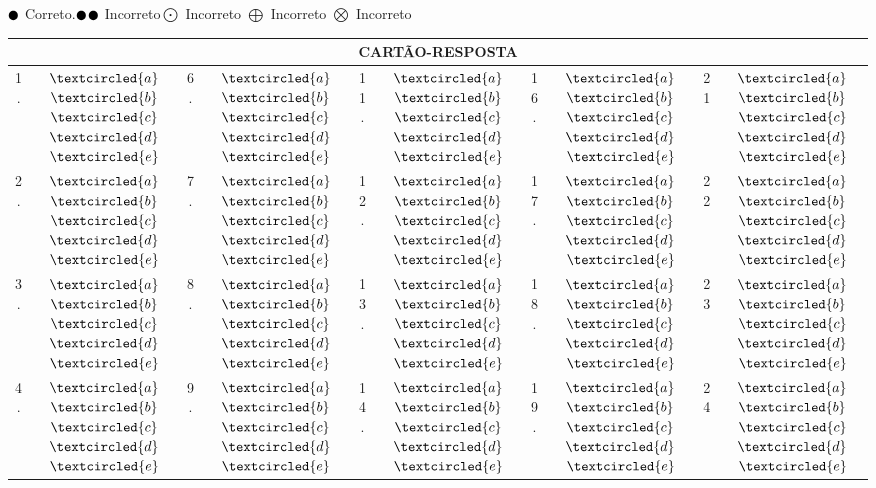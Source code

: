 \documentclass[14pt]{report}
\begin{document}
$\newmoon$ Correto.\hspace{2cm}$\newmoon$$\newmoon$ Incorreto\hspace{2cm}$\bigodot$ Incorreto\hspace{2cm} $\bigoplus$ Incorreto\hspace{2cm} $\bigotimes$ Incorreto
\Large
\begin{center}
 \begin{tabular}{ |c|c|c|c|c|c|c|c|c|c|}
 \hline
 \multicolumn{10}{|c|}{\vspace*{1cm}\LARGE{\textbf{CARTÃO-RESPOSTA}}}\\
 \hline
 \hline
 1. & $\textcircled{a}$$\textcircled{b}$$\textcircled{c}$$\textcircled{d}$$\textcircled{e}$&6.&$\textcircled{a}$$\textcircled{b}$$\textcircled{c}$$\textcircled{d}$$\textcircled{e}$&11.&$\textcircled{a}$$\textcircled{b}$$\textcircled{c}$$\textcircled{d}$$\textcircled{e}$&16.&$\textcircled{a}$$\textcircled{b}$$\textcircled{c}$$\textcircled{d}$$\textcircled{e}$&21&$\textcircled{a}$$\textcircled{b}$$\textcircled{c}$$\textcircled{d}$$\textcircled{e}$ \\
 2. & $\textcircled{a}$$\textcircled{b}$$\textcircled{c}$$\textcircled{d}$$\textcircled{e}$&7.&$\textcircled{a}$$\textcircled{b}$$\textcircled{c}$$\textcircled{d}$$\textcircled{e}$&12.&$\textcircled{a}$$\textcircled{b}$$\textcircled{c}$$\textcircled{d}$$\textcircled{e}
        $&17.&$\textcircled{a}$$\textcircled{b}$$\textcircled{c}$$\textcircled{d}$$\textcircled{e}$&22&$\textcircled{a}$$\textcircled{b}$$\textcircled{c}$$\textcircled{d}$$\textcircled{e}$ \\
 3. & $\textcircled{a}$$\textcircled{b}$$\textcircled{c}$$\textcircled{d}$$\textcircled{e}$&8.&$\textcircled{a}$$\textcircled{b}$$\textcircled{c}$$\textcircled{d}$$\textcircled{e}$&13.&$\textcircled{a}$$\textcircled{b}$$\textcircled{c}$$\textcircled{d}$$\textcircled{e}$&18.&$\textcircled{a}$$\textcircled{b}$$\textcircled{c}$$\textcircled{d}$$\textcircled{e}$&23&$\textcircled{a}$$\textcircled{b}$$\textcircled{c}$$\textcircled{d}$$\textcircled{e}$ \\
 4. & $\textcircled{a}$$\textcircled{b}$$\textcircled{c}$$\textcircled{d}$$\textcircled{e}$&9.&$\textcircled{a}$$\textcircled{b}$$\textcircled{c}$$\textcircled{d}$$\textcircled{e}$&14.&$\textcircled{a}$$\textcircled{b}$$\textcircled{c}$$\textcircled{d}$$\textcircled{e}$&19.&$\textcircled{a}$$\textcircled{b}$$\textcircled{c}$$\textcircled{d}$$\textcircled{e}$&24&$\textcircled{a}$$\textcircled{b}$$\textcircled{c}$$\textcircled{d}$$\textcircled{e}$ \\

\end{tabular}
\end{center}$$
\end{document}
